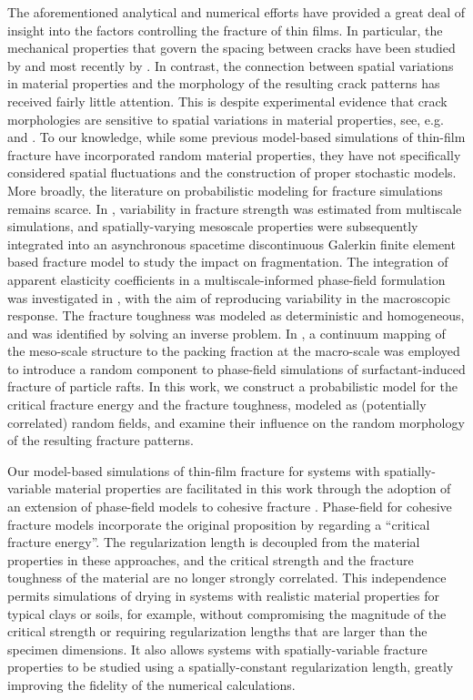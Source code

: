 The aforementioned analytical and numerical efforts have provided a great deal of insight into the factors controlling the fracture of thin films.  In particular, the mechanical properties that govern the spacing between cracks have been studied by \citet{hutchinson1991mixed, xia2000crack} and most recently by \citet{yin2008explicit}. In contrast,  the connection between spatial variations in material properties and the morphology of the resulting crack patterns has received fairly little attention. This is despite experimental evidence that crack morphologies are sensitive to spatial variations in material properties, see, e.g. \citet{kitsunezaki2016shaking, kitsunezaki2017stress, halasz2017effect, kitsunezaki2017memory} and \citet{nakahara2018mechanism}. To our knowledge, while some previous model-based simulations of thin-film fracture have incorporated random material properties, they have not specifically considered spatial fluctuations and the construction of proper stochastic models. More broadly, the literature on probabilistic modeling for fracture simulations remains scarce. In \cite{Acton2018}, variability in fracture strength was estimated from multiscale simulations, and spatially-varying mesoscale properties were subsequently integrated into an asynchronous spacetime discontinuous Galerkin finite element based fracture model to study the impact on fragmentation. The integration of apparent elasticity coefficients in a multiscale-informed phase-field formulation was investigated in \cite{Hun2019}, with the aim of reproducing variability in the macroscopic response. The fracture toughness was modeled as deterministic and homogeneous, and was identified by solving an inverse problem. In \cite{Peco2019}, a continuum mapping of the meso-scale structure to the packing fraction at the macro-scale was employed to introduce a random component to phase-field simulations of surfactant-induced fracture of particle rafts. In this work, we construct a probabilistic model for the critical fracture energy and the fracture toughness, modeled as (potentially correlated) random fields, and examine their influence on the random morphology of the resulting fracture patterns.

Our model-based simulations of thin-film fracture for systems with spatially-variable material properties are facilitated in this work through the adoption of an extension of phase-field models to cohesive fracture \cite{wu2016thermodynamically, wu2017unified, geelen2019phase}. Phase-field for cohesive fracture models incorporate the original proposition by \citet{xia2000crack} regarding a ``critical fracture energy''. The regularization length is decoupled from the material properties in these approaches, and the critical strength and the fracture toughness of the material are no longer strongly correlated. This independence permits simulations of drying in systems with realistic material properties for typical clays or soils, for example, without compromising the magnitude of the critical strength or requiring  regularization lengths that are larger than the specimen dimensions.  It also allows systems with spatially-variable fracture properties to be studied using a spatially-constant regularization length,  greatly improving the fidelity of the numerical calculations.

